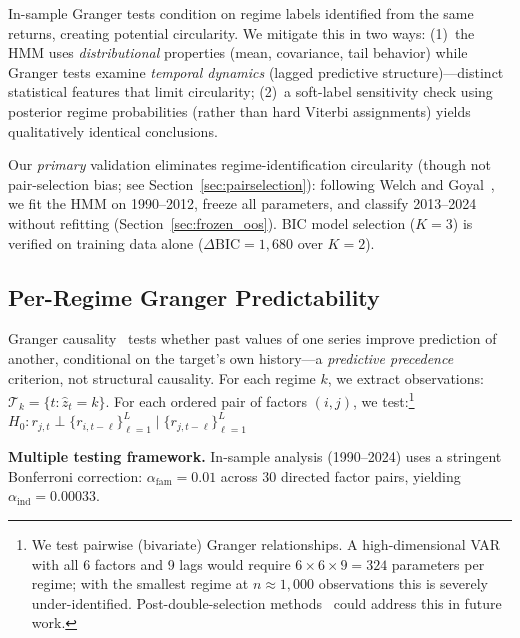 \documentclass[sigconf,anonymous]{acmart}
\begin{document}
In-sample Granger tests condition on regime labels identified from the same returns,
creating potential circularity. We mitigate this in two ways: (1)~the HMM uses
\emph{distributional} properties (mean, covariance, tail behavior) while Granger
tests examine \emph{temporal dynamics} (lagged predictive structure)---distinct
statistical features that limit circularity; (2)~a soft-label sensitivity check
using posterior regime probabilities (rather than hard Viterbi assignments) yields
qualitatively identical conclusions.

Our \emph{primary} validation eliminates regime-identification circularity
(though not pair-selection bias; see Section~\ref{sec:pairselection}): following
Welch and Goyal~\cite{welch2008comprehensive}, we fit the HMM on 1990--2012,
freeze all parameters, and classify 2013--2024 without refitting
(Section~\ref{sec:frozen_oos}). BIC model selection ($K=3$) is verified on
training data alone ($\Delta\text{BIC} = 1{,}680$ over $K=2$).

\subsection{Per-Regime Granger Predictability}
\label{sec:granger_method}

Granger causality~\cite{granger1969investigating,shojaie2022granger} tests whether past values
of one series improve prediction of another, conditional on the target's own history---a
\emph{predictive precedence} criterion, not structural causality.
For each regime $k$, we extract observations: $\mathcal{T}_k = \{t : \hat{z}_t = k\}$.
For each ordered pair of factors $(i, j)$, we test:\footnote{We test pairwise
(bivariate) Granger relationships. A high-dimensional VAR with all 6 factors and 9 lags
would require $6 \times 6 \times 9 = 324$ parameters per regime; with the smallest regime
at $n \approx 1{,}000$ observations this is severely under-identified. Post-double-selection
methods~\cite{hecq2023granger} could address this in future work.}
$H_0: r_{j,t} \perp \{r_{i,t-\ell}\}_{\ell=1}^{L} \mid \{r_{j,t-\ell}\}_{\ell=1}^{L}$

\textbf{Multiple testing framework.}
In-sample analysis (1990--2024) uses a stringent Bonferroni correction:
$\alpha_{\text{fam}} = 0.01$ across 30 directed factor pairs, yielding
$\alpha_{\text{ind}} = 0.00033$. 
\end{document}
